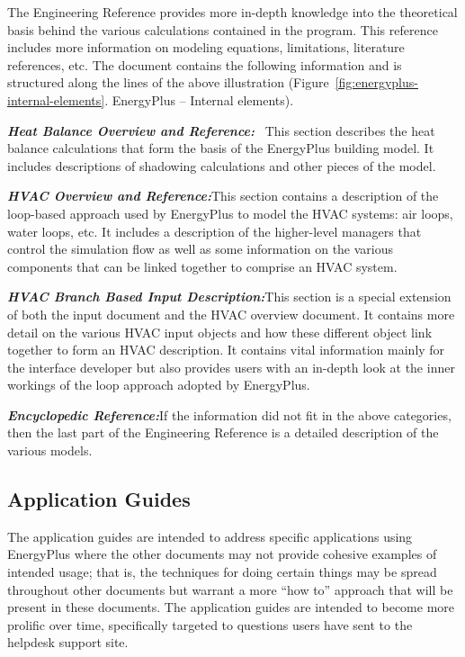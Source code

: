 The Engineering Reference provides more in-depth knowledge into the theoretical basis behind the various calculations contained in the program. This reference includes more information on modeling equations, limitations, literature references, etc. The document contains the following information and is structured along the lines of the above illustration (Figure~\ref{fig:energyplus-internal-elements}. EnergyPlus -- Internal elements).

\textbf{\emph{Heat Balance Overview and Reference:}}~ This section describes the heat balance calculations that form the basis of the EnergyPlus building model. It includes descriptions of shadowing calculations and other pieces of the model.

\textbf{\emph{HVAC Overview and Reference:}}This section contains a description of the loop-based approach used by EnergyPlus to model the HVAC systems: air loops, water loops, etc. It includes a description of the higher-level managers that control the simulation flow as well as some information on the various components that can be linked together to comprise an HVAC system.

\textbf{\emph{HVAC Branch Based Input Description:}}This section is a special extension of both the input document and the HVAC overview document. It contains more detail on the various HVAC input objects and how these different object link together to form an HVAC description. It contains vital information mainly for the interface developer but also provides users with an in-depth look at the inner workings of the loop approach adopted by EnergyPlus.

\textbf{\emph{Encyclopedic Reference:}}If the information did not fit in the above categories, then the last part of the Engineering Reference is a detailed description of the various models.

\subsection{Application Guides}\label{application-guides}

The application guides are intended to address specific applications using EnergyPlus where the other documents may not provide cohesive examples of intended usage; that is, the techniques for doing certain things may be spread throughout other documents but warrant a more ``how to'' approach that will be present in these documents. The application guides are intended to become more prolific over time, specifically targeted to questions users have sent to the helpdesk support site.

